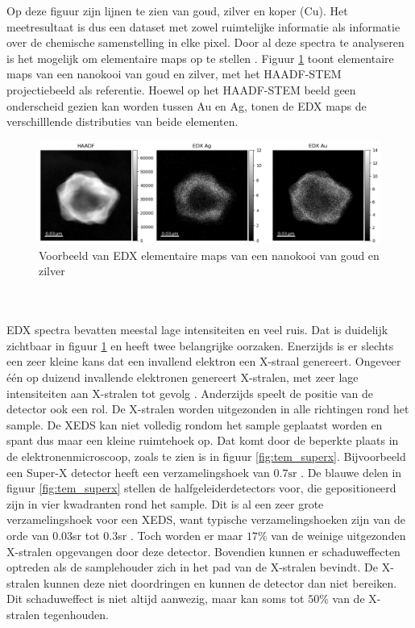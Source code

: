 \documentclass{report}
\begin{document}
Op deze figuur zijn lijnen te zien van goud, zilver en koper (Cu). Het meetresultaat is dus een dataset met zowel ruimtelijke informatie als informatie over de chemische samenstelling in elke pixel. Door al deze spectra te analyseren is het mogelijk om elementaire maps op te stellen \cite{book:williamscarter}. Figuur \ref{fig:tem_elementalmaps} toont elementaire maps van een nanokooi van goud en zilver, met het HAADF-STEM projectiebeeld als referentie. Hoewel op het HAADF-STEM beeld geen onderscheid gezien kan worden tussen Au en Ag, tonen de EDX maps de verschilllende distributies van beide elementen.
\begin{figure}[h!]
	\centering
	\includegraphics[width=15cm]{images/tem/elemental_maps.png}
	\caption{Voorbeeld van EDX elementaire maps van een nanokooi van goud en zilver}
	\label{fig:tem_elementalmaps}
\end{figure}
\\ \\
EDX spectra bevatten meestal lage intensiteiten en veel ruis. Dat is duidelijk zichtbaar in figuur \ref{fig:tem_elementalmaps} en heeft twee belangrijke oorzaken. Enerzijds is er slechts een zeer kleine kans dat een invallend elektron een X-straal genereert. Ongeveer één op duizend invallende elektronen genereert X-stralen, met zeer lage intensiteiten aan X-stralen tot gevolg \cite{book:williamscarter}. Anderzijds speelt de positie van de detector ook een rol. De X-stralen worden uitgezonden in alle richtingen rond het sample. De XEDS kan niet volledig rondom het sample geplaatst worden en spant dus maar een kleine ruimtehoek op. Dat komt door de beperkte plaats in de elektronenmicroscoop, zoals te zien is in figuur \ref{fig:tem_superx}. Bijvoorbeeld een Super-X detector heeft een verzamelingshoek van $0.7\text{sr}$ \cite{man:superx}. De blauwe delen in figuur \ref{fig:tem_superx} stellen de halfgeleiderdetectors voor, die gepositioneerd zijn in vier kwadranten rond het sample. Dit is al een zeer grote verzamelingshoek voor een XEDS, want typische verzamelingshoeken zijn van de orde van 0.03sr tot 0.3sr \cite{book:williamscarter}. Toch worden er maar $17\%$ van de weinige uitgezonden X-stralen opgevangen door deze detector. Bovendien kunnen er schaduweffecten optreden als de samplehouder zich in het pad van de X-stralen bevindt. De X-stralen kunnen deze niet doordringen en kunnen de detector dan niet bereiken. Dit schaduweffect is niet altijd aanwezig, maar kan soms tot $50\%$ van de X-stralen tegenhouden.
\end{document}
